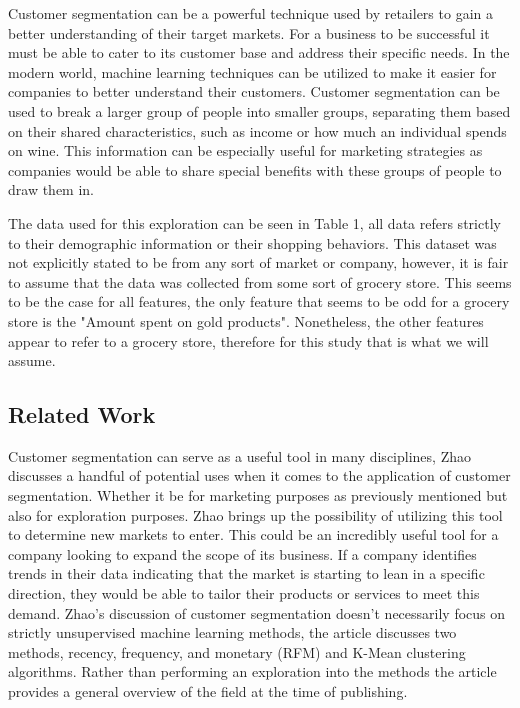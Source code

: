 \documentclass[twocolumn]{article}
\begin{document}
Customer segmentation can be a powerful technique used by retailers to gain a better understanding of their target markets. For a business to be successful it must be able to cater to its customer base and address their specific needs. In the modern world, machine learning techniques can be utilized to make it easier for companies to better understand their customers. Customer segmentation can be used to break a larger group of people into smaller groups, separating them based on their shared characteristics, such as income or how much an individual spends on wine. This information can be especially useful for marketing strategies as companies would be able to share special benefits with these groups of people to draw them in.

The data used for this exploration can be seen in Table 1, all data refers strictly to their demographic information or their shopping behaviors.\cite{patel} This dataset was not explicitly stated to be from any sort of market or company, however, it is fair to assume that the data was collected from some sort of grocery store. This seems to be the case for all features, the only feature that seems to be odd for a grocery store is the "Amount spent on gold products". Nonetheless, the other features appear to refer to a grocery store, therefore for this study that is what we will assume.
\subsection{Related Work}

Customer segmentation can serve as a useful tool in many disciplines, Zhao discusses a handful of potential uses when it comes to the application of customer segmentation. Whether it be for marketing purposes as previously mentioned but also for exploration purposes. Zhao brings up the possibility of utilizing this tool to determine new markets to enter.\cite{zhao} This could be an incredibly useful tool for a company looking to expand the scope of its business. If a company identifies trends in their data indicating that the market is starting to lean in a specific direction, they would be able to tailor their products or services to meet this demand. Zhao's discussion of customer segmentation doesn't necessarily focus on strictly unsupervised machine learning methods, the article discusses two methods, recency, frequency, and monetary (RFM) and K-Mean clustering algorithms.\cite{zhao} Rather than performing an exploration into the methods the article provides a general overview of the field at the time of publishing.
\end{document}
